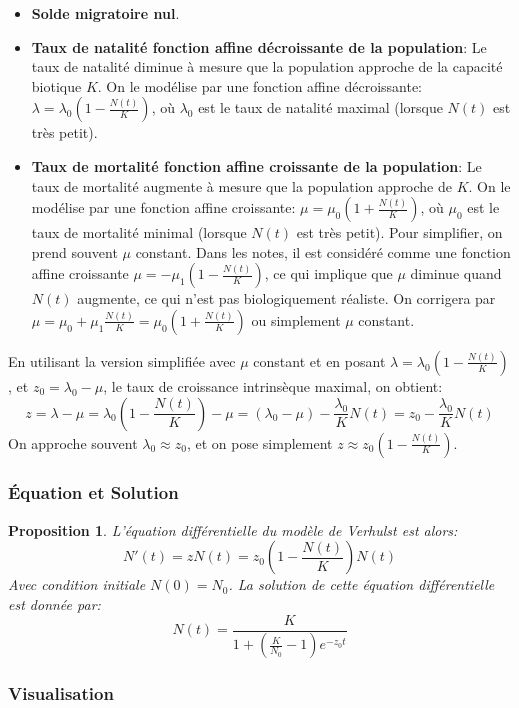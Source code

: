\documentclass{article}
\newtheorem{proposition}{Proposition}
\begin{document}
\begin{itemize}
    \item \textbf{Solde migratoire nul}.
    \item \textbf{Taux de natalité fonction affine décroissante de la population}: Le taux de natalité diminue à mesure que la population approche de la capacité biotique $K$. On le modélise par une fonction affine décroissante: $\lambda = \lambda_0 (1 - \frac{N(t)}{K})$, où $\lambda_0$ est le taux de natalité maximal (lorsque $N(t)$ est très petit).
    \item \textbf{Taux de mortalité fonction affine croissante de la population}: Le taux de mortalité augmente à mesure que la population approche de $K$. On le modélise par une fonction affine croissante: $\mu = \mu_0 (1 + \frac{N(t)}{K})$, où $\mu_0$ est le taux de mortalité minimal (lorsque $N(t)$ est très petit). Pour simplifier, on prend souvent $\mu$ constant. Dans les notes, il est considéré comme une fonction affine croissante $\mu = -\mu_1 (1 - \frac{N(t)}{K})$, ce qui implique que $\mu$ diminue quand $N(t)$ augmente, ce qui n'est pas biologiquement réaliste. On corrigera par $\mu = \mu_0 + \mu_1 \frac{N(t)}{K} = \mu_0 (1 + \frac{N(t)}{K})$ ou simplement $\mu$ constant.
\end{itemize}
En utilisant la version simplifiée avec $\mu$ constant et en posant $\lambda = \lambda_0 (1 - \frac{N(t)}{K})$, et $z_0 = \lambda_0 - \mu$, le taux de croissance intrinsèque maximal, on obtient:
\[
z = \lambda - \mu = \lambda_0 (1 - \frac{N(t)}{K}) - \mu = (\lambda_0 - \mu) - \frac{\lambda_0}{K} N(t) = z_0 - \frac{\lambda_0}{K} N(t)
\]
On approche souvent $\lambda_0 \approx z_0$, et on pose simplement $z \approx z_0 (1 - \frac{N(t)}{K})$.

\subsubsection{Équation et Solution}
\begin{proposition}
L'équation différentielle du modèle de Verhulst est alors:
\[
N'(t) = z N(t) = z_0 \left(1 - \frac{N(t)}{K}\right) N(t)
\]
Avec condition initiale $N(0) = N_0$. La solution de cette équation différentielle est donnée par:
\[
N(t) = \frac{K}{1 + \left(\frac{K}{N_0} - 1\right) e^{-z_0 t}}
\]
\end{proposition}

\subsubsection{Visualisation}
\end{document}

